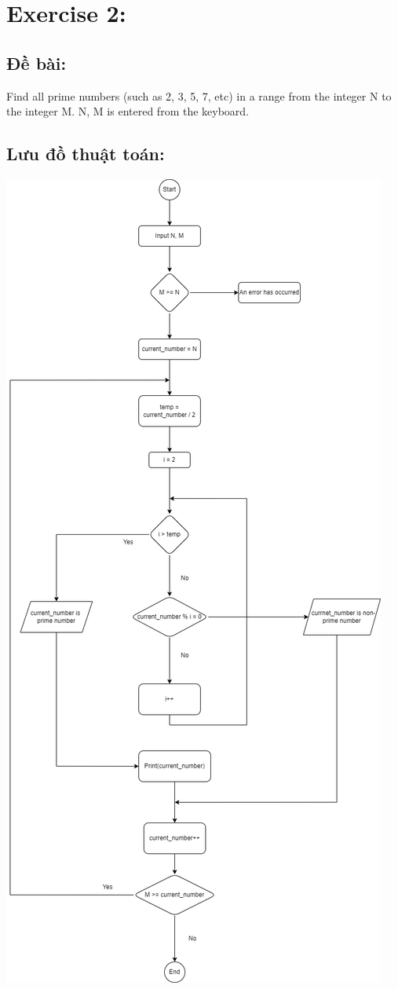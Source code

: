 \documentclass[12pt,a4paper,oneside]{article}
\begin{document}
\section*{{\huge Exercise 2:}}
\subsection*{Đề bài:}
Find all prime numbers (such as 2, 3, 5, 7, etc) in a range from the integer N to the integer M. N, M is entered from the keyboard.
\subsection*{Lưu đồ thuật toán:}
\begin{center}
\includegraphics[scale=0.37]{b2}
\end{center}
\end{document}
